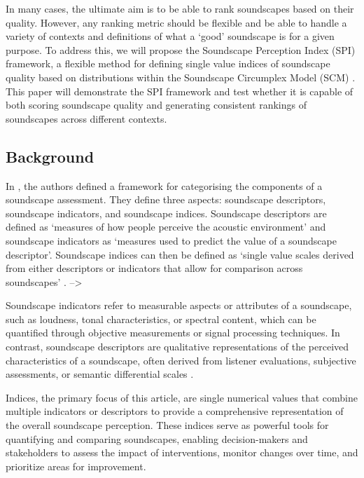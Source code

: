 \documentclass[
  authoryear,
  preprint,
  3p]{elsarticle}
\begin{document}
In many cases, the ultimate aim is to be able to rank soundscapes based
on their quality. However, any ranking metric should be flexible and be
able to handle a variety of contexts and definitions of what a `good'
soundscape is for a given purpose. To address this, we will propose the
Soundscape Perception Index (SPI) framework, a flexible method for
defining single value indices of soundscape quality based on
distributions within the Soundscape Circumplex Model (SCM)
\citep[\citet{Axelsson2012Swedish},
\citet{Mitchell2022How}]{Axelsson2010principal}. This paper will
demonstrate the SPI framework and test whether it is capable of both
scoring soundscape quality and generating consistent rankings of
soundscapes across different contexts.

\subsection{Background}\label{background}

In \citet{Aletta2016Soundscape}, the authors defined a framework for
categorising the components of a soundscape assessment. They define
three aspects: soundscape descriptors, soundscape indicators, and
soundscape indices. Soundscape descriptors are defined as `measures of
how people perceive the acoustic environment' and soundscape indicators
as `measures used to predict the value of a soundscape descriptor'.
Soundscape indices can then be defined as `single value scales derived
from either descriptors or indicators that allow for comparison across
soundscapes' \citep{Kang2019Towards}. --\textgreater{}

Soundscape indicators refer to measurable aspects or attributes of a
soundscape, such as loudness, tonal characteristics, or spectral
content, which can be quantified through objective measurements or
signal processing techniques. In contrast, soundscape descriptors are
qualitative representations of the perceived characteristics of a
soundscape, often derived from listener evaluations, subjective
assessments, or semantic differential scales \citep{ISO12913Part2}.

Indices, the primary focus of this article, are single numerical values
that combine multiple indicators or descriptors to provide a
comprehensive representation of the overall soundscape perception. These
indices serve as powerful tools for quantifying and comparing
soundscapes, enabling decision-makers and stakeholders to assess the
impact of interventions, monitor changes over time, and prioritize areas
for improvement.
\end{document}
